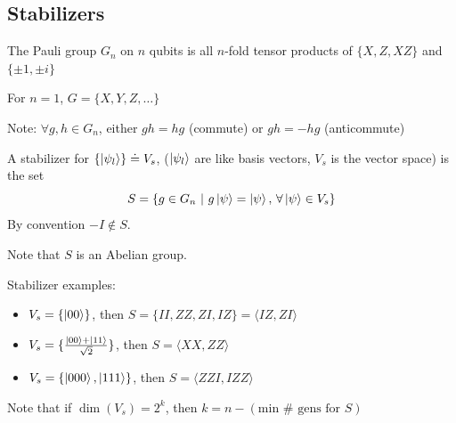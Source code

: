 \subsection{Stabilizers}
\begin{definition}
    The Pauli group $G_n$ on $n$ qubits is all $n$-fold tensor products of $\{X,Z,XZ\}$ and $\{\pm 1, \pm i\}$ 
\end{definition}
\begin{example}
    For $n=1$, $G = \{X, Y,Z, \ldots\}$
\end{example}
Note: $\forall g, h \in G_n$, either $gh=hg$ (commute) or $gh=-hg$ (anticommute)
\begin{definition}
    A stabilizer for  $\{\ket{\psi_l}\} \doteq V_s$, ($\ket{\psi_l}$ are like basis vectors, $V_s$ is the vector space) is the set \begin{equation}S = \{g \in G_n \,\, |\,\,  g\ket{\psi} = \ket{\psi}, \, \forall \ket{\psi} \in V_s\}\end{equation} By convention $-I \notin S$. 
\end{definition}
Note that $S$ is an Abelian group. 
\begin{example} Stabilizer examples:
    \begin{itemize}
        \item $V_s = \{\ket{00}\}$, then $S = \{II, ZZ, ZI, IZ\} = \langle IZ,ZI \rangle $ 
        \item $V_s = \{\frac{\ket{00} + \ket{11}}{\sqrt{2}}\}$, then $S = \langle XX,ZZ \rangle$
        \item $V_s = \{\ket{000}, \ket{111}\}$, then $S = \langle ZZI, IZZ \rangle$
    \end{itemize}
    Note that if $\dim(V_s) = 2^k$, then $k = n - (\text{min } \# \text{ gens for } S)$
    
\end{example}